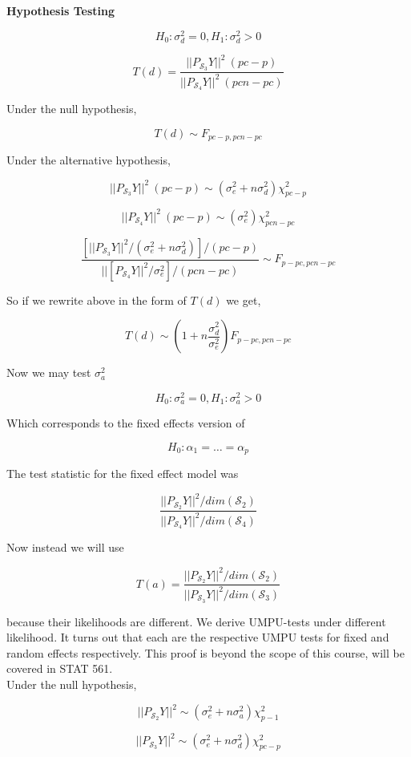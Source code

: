 \documentclass[11pt,fleqn]{book} %
\begin{document}
\textbf{Hypothesis Testing}

		$$H_0: \sigma_d^2 = 0, H_1: \sigma_d^2 > 0 $$


			$$T(d) = \frac{|| P_{\mathcal{S}_3} Y||^2 \ (pc-p)}{|| P_{\mathcal{S}_4} Y||^2 \ (pcn- pc)}  $$

Under the null hypothesis, 

		$$T(d) \sim F_{pc-p, pcn - pc} $$

Under the alternative hypothesis, 

		$$ || P_{\mathcal{S}_3} Y||^2 \ (pc-p) \sim (\sigma_e^2 + n \sigma_d^2) \chi^2_{pc-p}$$

		$$ || P_{\mathcal{S}_4} Y||^2 \ (pc-p) \sim (\sigma_e^2) \chi^2_{pcn-pc}$$

		$$\frac{[|| P_{\mathcal{S}_3} Y||^2 /(\sigma_e^2 + n \sigma_d^2)]/ (pc-p)}{|| [P_{\mathcal{S}_4} Y||^2 / \sigma^2_e]/ (pcn- pc)} \sim F_{p-pc, pcn - pc}$$

So if we rewrite above in the form of $T(d)$ we get, 

		$$T(d) \sim (1 + n\frac{\sigma^2_d}{\sigma^2_e})F_{p - pc, pcn - pc}$$

Now we may test $\sigma_a^2$

		$$H_0: \sigma_a^2 = 0, H_1: \sigma_a^2 > 0 $$


Which corresponds to the fixed effects version of
		
		$$H_0: \alpha_1 = \dots = \alpha_p $$

The test statistic for the fixed effect model was

		$$ \frac{|| P_{\mathcal{S}_2} Y||^2 / dim(\mathcal{S}_2)}{|| P_{\mathcal{S}_4} Y||^2 / dim(\mathcal{S}_4)}$$

Now instead we will use

	$$T(a) =  \frac{|| P_{\mathcal{S}_2} Y||^2 / dim(\mathcal{S}_2)}{|| P_{\mathcal{S}_3} Y||^2 / dim(\mathcal{S}_3)}$$

because their likelihoods are different. We derive UMPU-tests under different likelihood. It turns out that each are the respective UMPU tests for fixed and random effects respectively. This proof is beyond the scope of this course, will be covered in STAT 561. \\

Under the null hypothesis, 

		$$|| P_{\mathcal{S}_2} Y||^2 \sim (\sigma_e^2 + n\sigma^2_a) \chi^2_{p-1} $$


		$$|| P_{\mathcal{S}_3} Y||^2 \sim (\sigma_e^2 + n\sigma^2_d) \chi^2_{pc-p} $$
\end{document}
